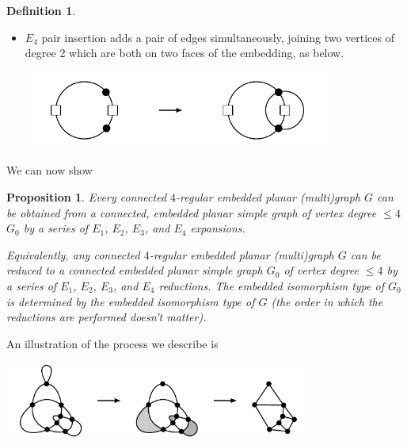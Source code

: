 \documentclass[amsmath,secnumarabic,floatfix,amssymb,nofootinbib,nobibnotes,letterpaper,11pt,tightenlines,showkeys]{revtex4}
\newtheorem{proposition}[theorem]{Proposition}
\theoremstyle{definition}
\newtheorem{definition}[theorem]{Definition}
\newcommand{\loopinsert}{E_1}
\newcommand{\edgedouble}{E_2}
\newcommand{\cutedgedouble}{E_3}
\newcommand{\pairinsert}{E_4}
\let\mgp=\marginpar \marginparwidth18mm \marginparsep1mm
\def\marginpar#1{\mgp{\raggedright\tiny #1}}
\let\lbl=\label
\def\label#1{\lbl{#1}\ifinner\else\marginpar{\ref{#1} #1}\ignorespaces\fi}
\begin{document}
\begin{definition}
\begin{itemize}
\item $\pairinsert$ pair insertion adds a pair of edges simultaneously, joining two vertices of degree 2 which are both on two faces of the embedding, as below.
  \begin{center}
    \includegraphics[width=4in]{pair-insertion.pdf}
  \end{center}
\end{itemize}
\end{definition}

We can now show

\begin{proposition}
Every connected $4$-regular embedded planar (multi)graph $G$ can be obtained from a connected, embedded planar simple graph of vertex degree $\leq 4$ $G_0$ by a series of $\loopinsert$, $\edgedouble$, $\cutedgedouble$, and $\pairinsert$ expansions.

Equivalently, any connected $4$-regular embedded planar (multi)graph $G$ can be reduced to a connected embedded planar simple graph $G_0$ of vertex degree $\leq 4$ by a series of $\loopinsert$, $\edgedouble$, $\cutedgedouble$, and $\pairinsert$ reductions. The embedded isomorphism type of $G_0$ is determined by the  embedded isomorphism type of $G$ (the order in which the reductions are performed doesn't matter).
\label{prop:reduce}
\end{proposition}

An illustration of the process we describe is
\begin{center}
\includegraphics[width=4in]{expansion-from-simple-graph.pdf}
\end{center}
\end{document}

